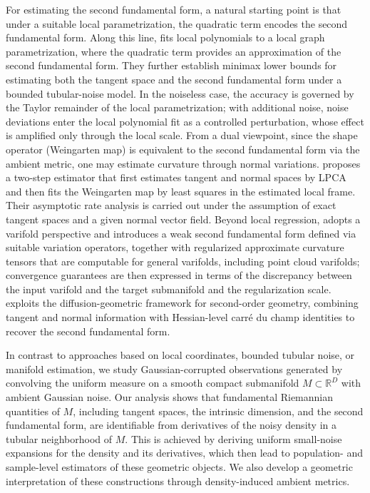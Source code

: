 \documentclass[11pt]{article}
\theoremstyle{plain}
\theoremstyle{definition}
\begin{document}
For estimating the second fundamental form, a natural starting point is that under a suitable local parametrization, the quadratic term encodes the second fundamental form.
Along this line, \citet{Aamari2017NonasymptoticRF} fits local polynomials to a local graph parametrization, where the quadratic term provides an approximation of the second fundamental form. They further establish minimax lower bounds for estimating both the tangent space and the second fundamental form under a bounded tubular-noise model. In the noiseless case, the accuracy is governed by the Taylor remainder of the local parametrization; with additional noise, noise deviations enter the local polynomial fit as a controlled perturbation, whose effect is amplified only through the local scale.
From a dual viewpoint, since the shape operator (Weingarten map) is equivalent to the second fundamental form via the ambient metric, one may estimate curvature through normal variations. \citet{Cao2019EfficientWM} proposes a two-step estimator that first estimates tangent and normal spaces by LPCA and then fits the Weingarten map by least squares in the estimated local frame. Their asymptotic rate analysis is carried out under the assumption of exact tangent spaces and a given normal vector field.
Beyond local regression, \citet{Buet2019WeakAA} adopts a varifold perspective and introduces a weak second fundamental form defined via suitable variation operators, together with regularized approximate curvature tensors that are computable for general varifolds, including point cloud varifolds; convergence guarantees are then expressed in terms of the discrepancy between the input varifold and the target submanifold and the regularization scale.
\citet{Jones2025ManifoldDG} exploits the diffusion-geometric framework for second-order geometry, combining tangent and normal information with Hessian-level carré du champ identities to recover the second fundamental form.

In contrast to approaches based on local coordinates, bounded tubular noise, or manifold estimation, we study Gaussian-corrupted observations generated by convolving the uniform measure on a smooth compact submanifold $M\subset\mathbb{R}^D$ with ambient Gaussian noise. Our analysis shows that fundamental Riemannian quantities of $M$, including tangent spaces, the intrinsic dimension, and the second fundamental form, are identifiable from derivatives of the noisy density in a tubular neighborhood of $M$. This is achieved by deriving uniform small-noise expansions for the density and its derivatives, which then lead to population- and sample-level estimators of these geometric objects. We also develop a geometric interpretation of these constructions through density-induced ambient metrics.
\end{document}
